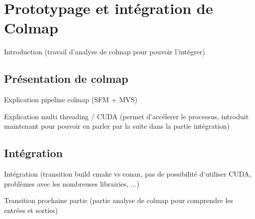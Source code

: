 \chapter{Prototypage et intégration de Colmap}

Introduction (travail d'analyse de colmap pour pouvoir l'intégrer)

\section{Présentation de colmap}

Explication pipeline colmap (SFM + MVS)



Explication multi threading / CUDA (permet d'accélerer le processus, introduit maintenant pour pouvoir en parler par la suite dans la partie intégration)

\section{Intégration}

Intégration (transition build cmake vs conan, pas de possibilité d'utiliser CUDA, problèmes avec les nombreuses librairies, ...)

Transition prochaine partie (partie analyse de colmap pour comprendre les entrées et sorties)

